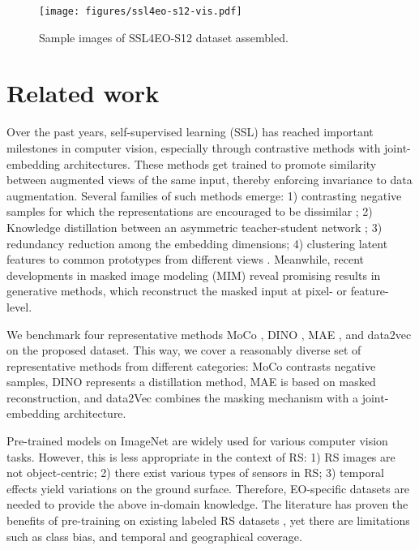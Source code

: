 \documentclass[lettersize,journal]{IEEEtran}
\begin{document}
\begin{figure*}
  \centering
  \texttt{[image: figures/ssl4eo-s12-vis.pdf]}
  \caption{Sample images of SSL4EO-S12 dataset assembled.}
  \label{fig:ssl4eo-s12-logo}
\vspace{-1em}
\end{figure*}




\section{Related work}
 \hspace{0.3em}
Over the past years, self-supervised learning (SSL) has reached important milestones in computer vision, especially through contrastive methods with joint-embedding architectures. These methods get trained to promote similarity between augmented views of the same input, thereby enforcing invariance to data augmentation. Several families of such methods emerge:
1) contrasting negative samples for which the representations are encouraged to be dissimilar \cite{he2020momentum}; 2) Knowledge distillation between an asymmetric teacher-student network \cite{caron2021emerging}; 3) redundancy reduction among the embedding dimensions; 4) clustering latent features to common prototypes from different views \cite{caron2020unsupervised}. Meanwhile, recent developments in masked image modeling (MIM) reveal promising results in generative methods, which reconstruct the masked input at pixel-\cite{he2021masked} or feature-\cite{baevski2022data2vec} level. 

We benchmark four representative methods MoCo \cite{he2020momentum}, DINO \cite{caron2021emerging}, MAE \cite{he2021masked}, and data2vec \cite{baevski2022data2vec} on the proposed dataset. This way, we cover a reasonably diverse set of representative methods from different categories: MoCo contrasts negative samples, DINO represents a distillation method, MAE is based on masked reconstruction, and data2Vec combines the masking mechanism with a joint-embedding architecture. 

\vspace{0.5em}
 \hspace{0.3em}
Pre-trained models on ImageNet are widely used for various computer vision tasks. However, this is less appropriate in the context of RS:
1) RS images are not object-centric; 2) there exist various types of sensors in RS; 3) temporal effects yield variations on the ground surface. Therefore, EO-specific datasets are needed to provide the above in-domain knowledge. The literature has proven the benefits of pre-training on existing labeled RS datasets \cite{neumann2020training,wang2022self}, yet there are limitations such as class bias, and temporal and geographical coverage.
\end{document}

